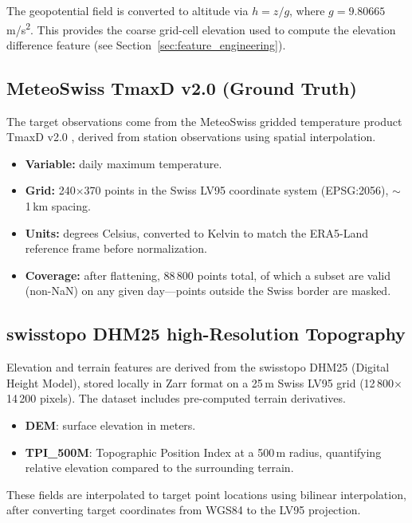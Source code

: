 The geopotential field is converted to altitude via $h = z / g$, where $g = 9.80665$\,m/s\textsuperscript{2}. This provides the coarse grid-cell elevation used to compute the elevation difference feature (see Section~\ref{sec:feature_engineering}).

\subsection{MeteoSwiss TmaxD v2.0 (Ground Truth)}

The target observations come from the MeteoSwiss gridded temperature product TmaxD v2.0 \citep{meteoswiss_tmax}, derived from station observations using spatial interpolation.

\begin{itemize}
    \item \textbf{Variable:} daily maximum temperature.
    \item \textbf{Grid:} 240$\times$370 points in the Swiss LV95 coordinate system (EPSG:2056), $\sim$1\,km spacing.
    \item \textbf{Units:} degrees Celsius, converted to Kelvin to match the ERA5-Land reference frame before normalization.
    \item \textbf{Coverage:} after flattening, 88\,800 points total, of which a subset are valid (non-NaN) on any given day---points outside the Swiss border are masked.
\end{itemize}

\subsection{swisstopo DHM25 high-Resolution Topography}

Elevation and terrain features are derived from the swisstopo DHM25 \citep{dhm25} (Digital Height Model), stored locally in Zarr format on a 25\,m Swiss LV95 grid (12\,800$\times$14\,200 pixels). The dataset includes pre-computed terrain derivatives.

\begin{itemize}
    \item \textbf{DEM}: surface elevation in meters.
    \item \textbf{TPI\_500M}: Topographic Position Index at a 500\,m radius, quantifying relative elevation compared to the surrounding terrain.
\end{itemize}

These fields are interpolated to target point locations using bilinear interpolation, after converting target coordinates from WGS84 to the LV95 projection.

